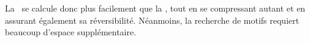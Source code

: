 La \kbwt\ se calcule donc plus facilement que la \bwt, tout en se compressant autant et en assurant également sa réversibilité. Néanmoins, la recherche de motifs requiert beaucoup d'espace supplémentaire.



